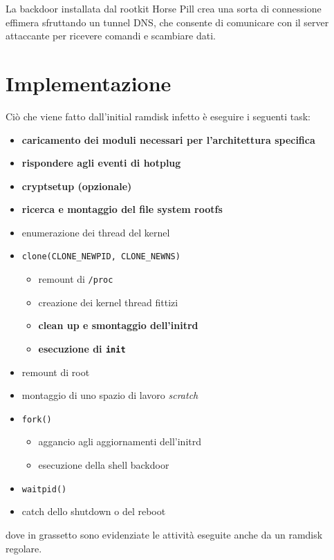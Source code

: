 \documentclass{article}
\begin{document}
La backdoor installata dal rootkit Horse Pill crea una sorta di connessione effimera sfruttando un tunnel DNS, che consente di comunicare con il server attaccante per ricevere comandi e scambiare dati.

\newpage
\section{Implementazione}
Ciò che viene fatto dall'initial ramdisk infetto è eseguire i seguenti task:
\begin{itemize}
	\item \textbf{caricamento dei moduli necessari per l'architettura specifica}
	\item \textbf{rispondere agli eventi di hotplug}
	\item \textbf{cryptsetup (opzionale)}
	\item \textbf{ricerca e montaggio del file system rootfs}
	\item enumerazione dei thread del kernel
	\item \texttt{clone(CLONE\_NEWPID, CLONE\_NEWNS)}
	\begin{itemize}
		\item remount di \texttt{/proc}
		\item creazione dei kernel thread fittizi
		\item \textbf{clean up e smontaggio dell'initrd}
		\item \textbf{esecuzione di \texttt{init}}
	\end{itemize}
	\item remount di root
	\item montaggio di uno spazio di lavoro \textsl{scratch}
	\item \texttt{fork()}
	\begin{itemize}
		\item aggancio agli aggiornamenti dell'initrd
		\item esecuzione della shell backdoor
	\end{itemize}
	\item \texttt{waitpid()}
	\item catch dello shutdown o del reboot
\end{itemize}
dove in grassetto sono evidenziate le attività eseguite anche da un ramdisk regolare.
\end{document}

